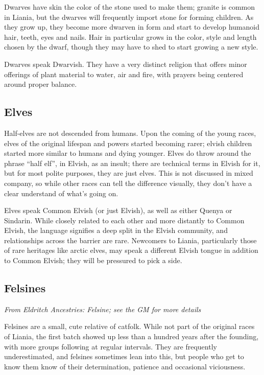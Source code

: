 \documentclass{report}
\begin{document}
Dwarves have skin the color of the stone used to make them; granite is common
in Liania, but the dwarves will frequently import stone for forming children.
As they grow up, they become more dwarven in form and start to develop humanoid
hair, teeth, eyes and nails. Hair in particular grows in the color, style and
length chosen by the dwarf, though they may have to shed to start growing a new
style.

Dwarves speak Dwarvish. They have a very distinct religion that offers minor
offerings of plant material to water, air and fire, with prayers being centered around
proper balance.

\subsection{Elves}

Half-elves are not descended from humans. Upon the coming of the young races,
elves of the original lifespan and powers started becoming rarer; elvish
children started more similar to humans and dying younger. Elves do throw around
the phrase ``half elf'', in Elvish, as an insult; there are technical terms in Elvish for it,
but for most polite purposes, they are just elves. This is not
discussed in mixed company, so while other races can tell the difference
visually, they don't have a clear understand of what's going on.

Elves speak Common Elvish (or just Elvish), as well as either Quenya or Sindarin.
While closely related to each other and more distantly to Common Elvish, the
language signifies a deep split in the Elvish community, and relationships
across the barrier are rare. Newcomers to Liania, particularly those of rare
heritages like arctic elves, may speak a different Elvish
tongue in addition to Common Elvish; they will be pressured to pick a side.

\subsection{Felsines}

\emph{From \emph{Eldritch Ancestries: Felsine}; see the GM for more details}

Felsines are a small, cute relative of catfolk. While not part of the original
races of Liania, the first batch showed up less than a hundred years after the
founding, with more groups following at regular intervals. They are frequently
underestimated, and felsines sometimes lean into this, but people who get to
know them know of their determination, patience and occasional viciousness.
\end{document}
